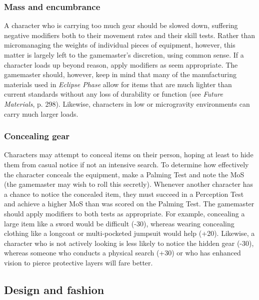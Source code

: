 \subsubsection{Mass and encumbrance} 

A character who is carrying too much gear should be slowed down, suffering negative modifiers both to their movement rates and their skill tests. Rather than micromanaging the weights of individual pieces of equipment, however, this matter is largely left to the gamemaster’s discretion, using common sense. If a character loads up beyond reason, apply modifiers as seem appropriate. The gamemaster should, however, keep in mind that many of the manufacturing materials used in \emph{Eclipse Phase} allow for items that are much lighter than current standards without any loss of durability or function (see \emph{Future Materials}, p. 298). Likewise, characters in low or microgravity environments can carry much larger loads. 

\subsubsection{Concealing gear} 

Characters may attempt to conceal items on their person, hoping at least to hide them from casual notice if not an intensive search. To determine how effectively the character conceals the equipment, make a Palming Test and note the MoS (the gamemaster may wish to roll this secretly). Whenever another character has a chance to notice the concealed item, they must succeed in a Perception Test and achieve a higher MoS than was scored on the Palming Test. The gamemaster should apply modifiers to both tests as appropriate. For example, concealing a large item like a sword would be difficult (-30), whereas wearing concealing clothing like a longcoat or multi-pocketed jumpsuit would help (+20). Likewise, a character who is not actively looking is less likely to notice the hidden gear (-30), whereas someone who conducts a physical search (+30) or who has enhanced vision to pierce protective layers will fare better. 



\subsection{Design and fashion} \label{sec:design-fashion} 

